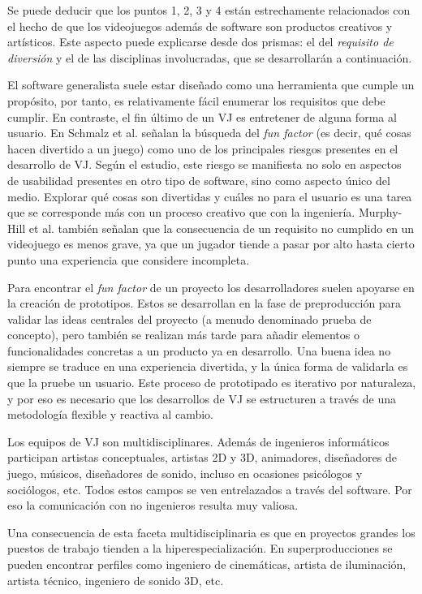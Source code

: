Se puede deducir que los puntos 1, 2, 3 y 4 están estrechamente relacionados con el hecho de que los videojuegos además de software son productos creativos y artísticos. Este aspecto puede explicarse desde dos prismas: el del \textit{requisito de diversión} y el de las disciplinas involucradas, que se desarrollarán a continuación.

El software generalista suele estar diseñado como una herramienta que cumple un propósito, por tanto, es relativamente fácil enumerar los requisitos que debe cumplir. En contraste, el fin último de un VJ es entretener de alguna forma al usuario. En Schmalz et al.\cite{mark-schmalz} señalan la búsqueda del \textit{fun factor} (es decir, qué cosas hacen divertido a un juego) como uno de los principales riesgos presentes en el desarrollo de VJ. Según el estudio, este riesgo se manifiesta no solo en aspectos de usabilidad presentes en otro tipo de software, sino como aspecto único del medio. Explorar qué cosas son divertidas y cuáles no para el usuario es una tarea que se corresponde más con un proceso creativo que con la ingeniería. Murphy-Hill et al. también señalan que la consecuencia de un requisito no cumplido en un videojuego es menos grave, ya que un jugador tiende a pasar por alto hasta cierto punto una experiencia que considere incompleta.

Para encontrar el \textit{fun factor} de un proyecto los desarrolladores suelen apoyarse en la creación de prototipos. Estos se desarrollan en la fase de preproducción para validar las ideas centrales del proyecto (a menudo denominado prueba de concepto), pero también se realizan más tarde para añadir elementos o funcionalidades concretas a un producto ya en desarrollo. Una buena idea no siempre se traduce en una experiencia divertida, y la única forma de validarla es que la pruebe un usuario. Este proceso de prototipado es iterativo por naturaleza, y por eso es necesario que los desarrollos de VJ se estructuren a través de una metodología flexible y reactiva al cambio. 

Los equipos de VJ son multidisciplinares. Además de ingenieros informáticos participan artistas conceptuales, artistas 2D y 3D, animadores, diseñadores de juego, músicos, diseñadores de sonido, incluso en ocasiones psicólogos y sociólogos, etc. Todos estos campos se ven entrelazados a través del software. Por eso la comunicación con no ingenieros resulta muy valiosa.

Una consecuencia de esta faceta multidisciplinaria es que en proyectos grandes los puestos de trabajo tienden a la hiperespecialización. En superproducciones se pueden encontrar perfiles como ingeniero de cinemáticas, artista de iluminación, artista técnico, ingeniero de sonido 3D, etc.

